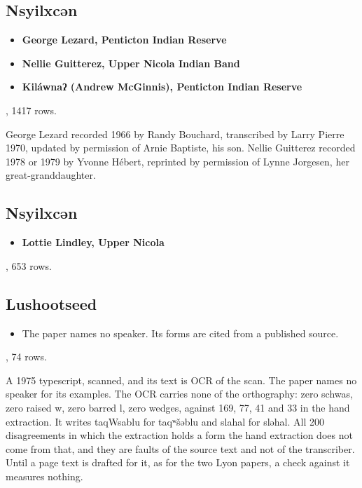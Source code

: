 \subsection{Nsyilxcən}

\begin{itemize}
\item \textbf{George Lezard, Penticton Indian Reserve}
\item \textbf{Nellie Guitterez, Upper Nicola Indian Band}
\item \textbf{Kiláwnaʔ (Andrew McGinnis), Penticton Indian Reserve}
\end{itemize}

\cite{src:Lyon-2015}, 1417 rows.

George Lezard recorded 1966 by Randy Bouchard, transcribed by Larry Pierre 1970, updated by permission of Arnie Baptiste, his son. Nellie Guitterez recorded 1978 or 1979 by Yvonne Hébert, reprinted by permission of Lynne Jorgesen, her great-granddaughter.

\subsection{Nsyilxcən}

\begin{itemize}
\item \textbf{Lottie Lindley, Upper Nicola}
\end{itemize}

\cite{src:Lindley-and-Lyon-2013}, 653 rows.

\subsection{Lushootseed}

\begin{itemize}
\item The paper names no speaker. Its forms are cited from a published source.
\end{itemize}

\cite{src:Hilbert-and-Hess-1975}, 74 rows.

A 1975 typescript, scanned, and its text is OCR of the scan. The paper names no speaker for its examples. The OCR carries none of the orthography: zero schwas, zero raised w, zero barred l, zero wedges, against 169, 77, 41 and 33 in the hand extraction. It writes taqWsablu for taqʷšəblu and slahal for sləhal. All 200 disagreements in which the extraction holds a form the hand extraction does not come from that, and they are faults of the source text and not of the transcriber. Until a page text is drafted for it, as for the two Lyon papers, a check against it measures nothing.

